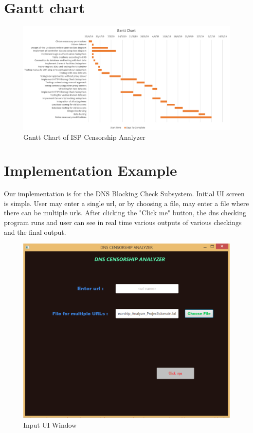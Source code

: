 \documentclass[12pt]{article}
\begin{document}
\section{Gantt chart}

\begin{figure}[H]
    \centering
    \includegraphics[width=\textwidth]{gantFinal2.PNG}
    \caption{Gantt Chart of ISP Censorship Analyzer}
    \label{fig:gantt}
\end{figure}



\newpage
\section{Implementation Example}

Our implementation is for the DNS Blocking Check Subsystem. Initial UI screen is simple. User may enter a single url, or by choosing a file, may enter a file where there can be multiple urls. After clicking the "Click me" button, the dns checking program runs and user can see in real time various outputs of various checkings and the final output.
\begin{figure}[H]
    \centering
    \includegraphics[width=\textwidth]{promptscreen.png}
    \caption{Input UI Window}
    \label{fig:is}
\end{figure}
\end{document}
